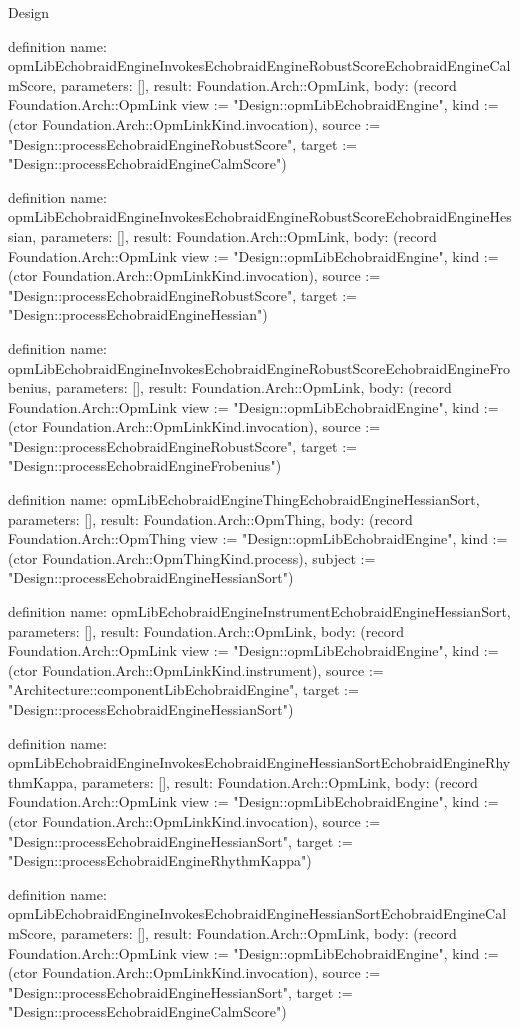 \begin{lexlean}{Design}
\begin{semanticmodule}
definition{
  name: opmLibEchobraidEngineInvokesEchobraidEngineRobustScoreEchobraidEngineCalmScore,
  parameters: [],
  result: Foundation.Arch::OpmLink,
  body: (record Foundation.Arch::OpmLink {view := "Design::opmLibEchobraidEngine", kind := (ctor Foundation.Arch::OpmLinkKind.invocation), source := "Design::processEchobraidEngineRobustScore", target := "Design::processEchobraidEngineCalmScore"})
}

definition{
  name: opmLibEchobraidEngineInvokesEchobraidEngineRobustScoreEchobraidEngineHessian,
  parameters: [],
  result: Foundation.Arch::OpmLink,
  body: (record Foundation.Arch::OpmLink {view := "Design::opmLibEchobraidEngine", kind := (ctor Foundation.Arch::OpmLinkKind.invocation), source := "Design::processEchobraidEngineRobustScore", target := "Design::processEchobraidEngineHessian"})
}

definition{
  name: opmLibEchobraidEngineInvokesEchobraidEngineRobustScoreEchobraidEngineFrobenius,
  parameters: [],
  result: Foundation.Arch::OpmLink,
  body: (record Foundation.Arch::OpmLink {view := "Design::opmLibEchobraidEngine", kind := (ctor Foundation.Arch::OpmLinkKind.invocation), source := "Design::processEchobraidEngineRobustScore", target := "Design::processEchobraidEngineFrobenius"})
}

definition{
  name: opmLibEchobraidEngineThingEchobraidEngineHessianSort,
  parameters: [],
  result: Foundation.Arch::OpmThing,
  body: (record Foundation.Arch::OpmThing {view := "Design::opmLibEchobraidEngine", kind := (ctor Foundation.Arch::OpmThingKind.process), subject := "Design::processEchobraidEngineHessianSort"})
}

definition{
  name: opmLibEchobraidEngineInstrumentEchobraidEngineHessianSort,
  parameters: [],
  result: Foundation.Arch::OpmLink,
  body: (record Foundation.Arch::OpmLink {view := "Design::opmLibEchobraidEngine", kind := (ctor Foundation.Arch::OpmLinkKind.instrument), source := "Architecture::componentLibEchobraidEngine", target := "Design::processEchobraidEngineHessianSort"})
}

definition{
  name: opmLibEchobraidEngineInvokesEchobraidEngineHessianSortEchobraidEngineRhythmKappa,
  parameters: [],
  result: Foundation.Arch::OpmLink,
  body: (record Foundation.Arch::OpmLink {view := "Design::opmLibEchobraidEngine", kind := (ctor Foundation.Arch::OpmLinkKind.invocation), source := "Design::processEchobraidEngineHessianSort", target := "Design::processEchobraidEngineRhythmKappa"})
}

definition{
  name: opmLibEchobraidEngineInvokesEchobraidEngineHessianSortEchobraidEngineCalmScore,
  parameters: [],
  result: Foundation.Arch::OpmLink,
  body: (record Foundation.Arch::OpmLink {view := "Design::opmLibEchobraidEngine", kind := (ctor Foundation.Arch::OpmLinkKind.invocation), source := "Design::processEchobraidEngineHessianSort", target := "Design::processEchobraidEngineCalmScore"})
}


\end{semanticmodule}
\end{lexlean}
